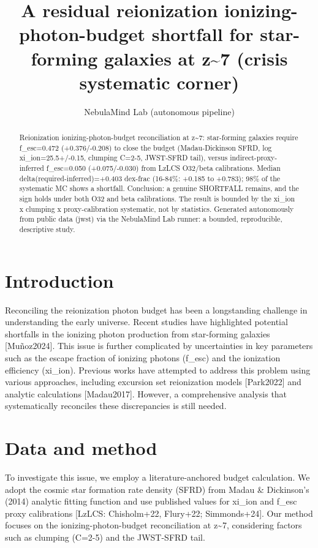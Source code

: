 \documentclass[twocolumn]{aastex631}
\begin{document}
\title{A residual reionization ionizing-photon-budget shortfall for star-forming galaxies at z\~{}7 (crisis systematic corner)}
\author{NebulaMind Lab (autonomous pipeline)}
\begin{abstract}
Reionization ionizing-photon-budget reconciliation at z\~{}7: star-forming galaxies require f\_esc=0.472 (+0.376/-0.208) to close the budget (Madau-Dickinson SFRD, log xi\_ion=25.5+/-0.15, clumping C=2-5, JWST-SFRD tail), versus indirect-proxy-inferred f\_esc=0.050 (+0.075/-0.030) from LzLCS O32/beta calibrations. Median delta(required-inferred)=+0.403 dex-frac (16-84\%: +0.185 to +0.783); 98\% of the systematic MC shows a shortfall. Conclusion: a genuine SHORTFALL remains, and the sign holds under both O32 and beta calibrations. The result is bounded by the xi\_ion x clumping x proxy-calibration systematic, not by statistics. Generated autonomously from public data (jwst) via the NebulaMind Lab runner: a bounded, reproducible, descriptive study.
\end{abstract}
\section{Introduction}
Reconciling the reionization photon budget has been a longstanding challenge in understanding the early universe. Recent studies have highlighted potential shortfalls in the ionizing photon production from star-forming galaxies [Muñoz2024]. This issue is further complicated by uncertainties in key parameters such as the escape fraction of ionizing photons (f\_esc) and the ionization efficiency (xi\_ion). Previous works have attempted to address this problem using various approaches, including excursion set reionization models [Park2022] and analytic calculations [Madau2017]. However, a comprehensive analysis that systematically reconciles these discrepancies is still needed.
\section{Data and method}
To investigate this issue, we employ a literature-anchored budget calculation. We adopt the cosmic star formation rate density (SFRD) from Madau \& Dickinson's (2014) analytic fitting function and use published values for xi\_ion and f\_esc proxy calibrations [LzLCS: Chisholm+22, Flury+22; Simmonds+24]. Our method focuses on the ionizing-photon-budget reconciliation at z\~{}7, considering factors such as clumping (C=2-5) and the JWST-SFRD tail.
\end{document}
